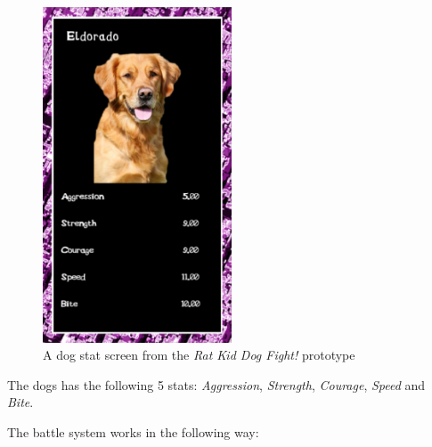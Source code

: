 \begin{figure}[h!]
	\centering
    \includegraphics[width=0.5\textwidth]{DogStats.png}
    \caption{A dog stat screen from the \textit{Rat Kid Dog Fight!} prototype}
    \label{fig:DogStatScreen}
\end{figure}


The dogs has the following 5 stats: \textit{Aggression}, \textit{Strength}, \textit{Courage}, \textit{Speed} and \textit{Bite}.\

The battle system works in the following way:

